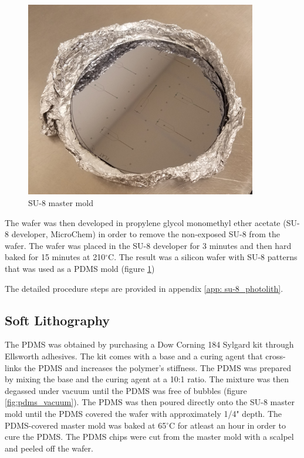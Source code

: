 \begin{figure}[h]
    \centering
    \includegraphics[width=0.9\textwidth]{images/su-8_mold.jpg}
    \caption{SU-8 master mold}
    \label{fig:SU-8_master_mold}
\end{figure}

\par The wafer was then developed in propylene glycol monomethyl ether acetate (SU-8 developer, MicroChem) in order to remove the non-exposed SU-8 from the wafer. The wafer was placed in the SU-8 developer for 3 minutes and then hard baked for 15 minutes at 210$^\circ$C. The result was a silicon wafer with SU-8 patterns that was used as a PDMS mold (figure \ref{fig:SU-8_master_mold})

The detailed procedure steps are provided in appendix \ref{app: su-8_photolith}.

\subsection*{Soft Lithography}
\par The PDMS was obtained by purchasing a Dow Corning 184 Sylgard kit through Ellsworth adhesives. The kit comes with a base and a curing agent that cross-links the PDMS and increases the polymer's stiffness. The PDMS was prepared by mixing the base and the curing agent at a 10:1 ratio. The mixture was then degassed under vacuum until the PDMS was free of bubbles (figure \ref{fig:pdms_vacuum}). The PDMS was then poured directly onto the SU-8 master mold until the PDMS covered the wafer with approximately 1/4" depth. The PDMS-covered master mold was baked at 65$^\circ$C for atleast an hour in order to cure the PDMS. The PDMS chips were cut from the master mold with a scalpel and peeled off the wafer. 

